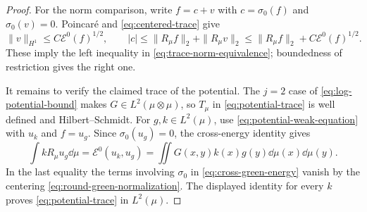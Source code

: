 \begin{proof}
For the norm comparison, write $f=c+v$ with $c=\sigma_0(f)$ and
$\sigma_0(v)=0$.  Poincar\'e and \eqref{eq:centered-trace} give
\[
 \|v\|_{H^1}\le C\mathcal E^0(f)^{1/2},\qquad
 |c|\le\|R_\mu f\|_2+\|R_\mu v\|_2
       \le\|R_\mu f\|_2+C\mathcal E^0(f)^{1/2}.
\]
These imply the left inequality in \eqref{eq:trace-norm-equivalence};
boundedness of restriction gives the right one.

It remains to verify the claimed trace of the potential.  The $j=2$
case of \eqref{eq:log-potential-bound} makes
$G\in L^2(\mu\otimes\mu)$, so $T_\mu$ in \eqref{eq:potential-trace} is
well defined and Hilbert--Schmidt.  For $g,k\in L^2(\mu)$, use
\eqref{eq:potential-weak-equation} with $u_k$ and $f=u_g$.  Since
$\sigma_0(u_g)=0$, the cross-energy identity gives
\[
 \int k R_\mu u_g\dd\mu
 =\mathcal E^0(u_k,u_g)
 =\iint G(x,y)k(x)g(y)\dd\mu(x)\dd\mu(y).
\]
In the last equality the terms involving $\sigma_0$ in
\eqref{eq:cross-green-energy} vanish by the centering
\eqref{eq:round-green-normalization}.  The displayed identity for every
$k$ proves \eqref{eq:potential-trace} in $L^2(\mu)$.
\end{proof}

